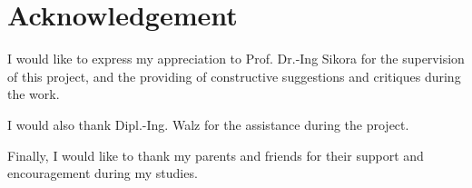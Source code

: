 \chapter*{Acknowledgement}

I would like to express my appreciation to Prof. Dr.-Ing Sikora for the
supervision of this project, and the providing of constructive suggestions
and critiques during the work.

I would also thank Dipl.-Ing. Walz for the assistance during the project.

Finally, I would like to thank my parents and friends for their support and
encouragement during my studies.
